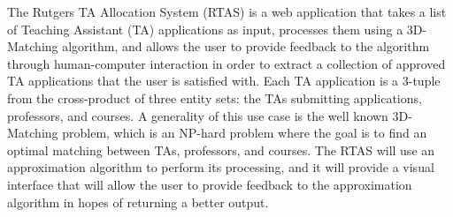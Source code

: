 The Rutgers TA Allocation System (RTAS) is a web application that takes a list of Teaching Assistant (TA) applications as input, processes them using a 3D-Matching algorithm, and allows the user to provide feedback to the algorithm through human-computer interaction in order to extract a collection of approved TA applications that the user is satisfied with. Each TA application is a 3-tuple from the cross-product of three entity sets: the TAs submitting applications, professors, and courses. A generality of this use case is the well known 3D-Matching problem, which is an NP-hard problem where the goal is to find an optimal matching between TAs, professors, and courses. The RTAS will use an approximation algorithm to perform its processing, and it will provide a visual interface that will allow the user to provide feedback to the approximation algorithm in hopes of returning a better output.